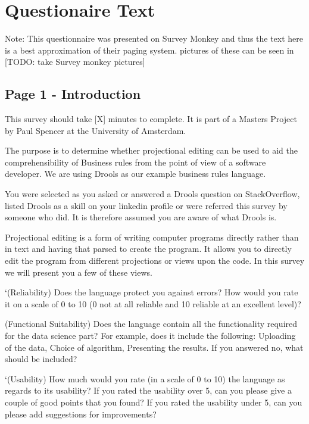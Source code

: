 \chapter{Questionaire Text}\label{Appendix:Questionaire_text}

Note: This questionnaire was presented on Survey Monkey and thus the text here is a best approximation of their paging system.
pictures of these can be seen in [TODO: take Survey monkey pictures]

\section{Page 1 - Introduction}

This survey should take [X] minutes to complete.  
It is part of a Masters Project by Paul Spencer at the University of Amsterdam.

The purpose is to determine whether projectional editing can be used to aid the comprehensibility of Business rules from the point of view of a software developer. 
We are using Drools as our example business rules language.

You were selected as you asked or answered a Drools question on StackOverflow, listed Drools as a skill on your linkedin profile or were referred this survey by someone who did.
It is therefore assumed you are aware of what Drools is.

Projectional editing is a form of writing computer programs directly rather than in text and having that parsed to create the program.
It allows you to directly edit the program from different projections or views upon the code.
In this survey we will present you a few of these views.




‘(Reliability) Does the language protect you against errors?
How would you rate it on a scale of 0 to 10 (0 not at
all reliable and 10 reliable at an excellent level)?

(Functional Suitability) Does the language contain
all the functionality required for the data science part? For
example, does it include the following: Uploading of the data,
Choice of algorithm, Presenting the results. If you answered
no, what should be included?

‘(Usability) How much would you rate (in a
scale of 0 to 10) the language as regards to its usability? If
you rated the usability over 5, can you please give a couple of
good points that you found? If you rated the usability under 5,
can you please add suggestions for improvements?




